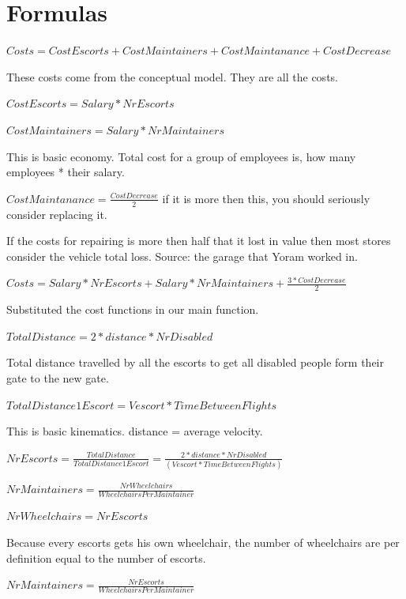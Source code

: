 \documentclass[a4paper, 11pt, notitlepage]{report}
\begin{document}
	\section{Formulas}
\begin{description}
	\item $Costs = CostEscorts + CostMaintainers + CostMaintanance + CostDecrease$
	\item[Explanation:] These costs come from the conceptual model. They are all the costs.
	\item $CostEscorts = Salary * NrEscorts$
	\item $CostMaintainers = Salary * NrMaintainers$
	\item[Explanation:] This is basic economy. Total cost for a group of employees is, how many employees * their salary.
	\item $CostMaintanance = \frac{CostDecrease}{2} $ if it is more then this, you should seriously consider replacing it.
	\item[Explanation:] If the costs for repairing is more then half that it lost in value then most stores consider the vehicle total loss. Source: the garage that Yoram worked in.
	\item
	\item $Costs = Salary * NrEscorts + Salary * NrMaintainers + \frac{3* CostDecrease}{2}$
	\item[Explanation:] Substituted the cost functions in our main function.
	\item $TotalDistance = 2*distance*NrDisabled$
	\item[Explanation:] Total distance travelled by all the escorts to get all disabled people form their gate to the new gate.
	\item $TotalDistance1Escort = Vescort*TimeBetweenFlights$
	\item[Explanation:] This is basic kinematics. distance = average velocity.
	\item $NrEscorts = \frac{TotalDistance}{TotalDistance1Escort} = \frac{2*distance*NrDisabled}{(Vescort*TimeBetweenFlights)}$
	\item
	\item $NrMaintainers = \frac{NrWheelchairs}{WheelchairsPerMaintainer}$
	\item $NrWheelchairs = NrEscorts$
	\item[Explanation:] Because every escorts gets his own wheelchair, the number of wheelchairs are per definition equal to the number of escorts.
	\item $NrMaintainers = \frac{NrEscorts}{WheelchairsPerMaintainer}$

\end{description}
\end{document}
